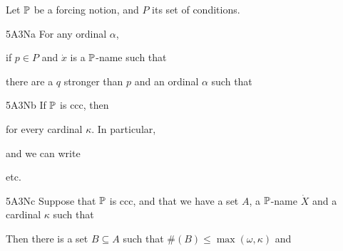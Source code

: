  Let $\Bbb P$ be a forcing notion, and
$P$ its set of conditions.

\spheader 5A3Na For any ordinal $\alpha$,


\noindent{}if $p\in P$ and $\dot x$ is a
$\Bbb P$-name such that


\noindent there are a $q$ stronger than $p$ and an ordinal $\alpha$ such
that



\spheader 5A3Nb If $\Bbb P$ is ccc, then


\noindent for every cardinal $\kappa$.   In particular,


\noindent and we can write


\noindent etc.

\spheader 5A3Nc Suppose that $\Bbb P$ is ccc, and that we have a set $A$,
a $\Bbb P$-name $\dot X$ and a cardinal $\kappa$ such that


\noindent Then
there is a set $B\subseteq A$ such that $\#(B)\le\max(\omega,\kappa)$ and


